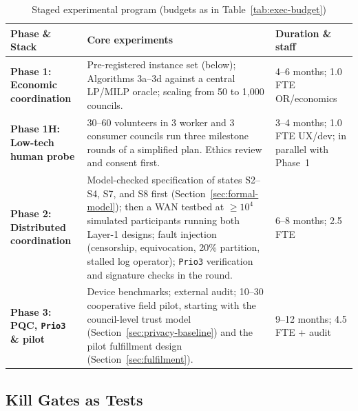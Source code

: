 \documentclass[10pt,twoside,openany]{book}
\theoremstyle{dpepstyle}
\begin{document}
\begin{table}[htbp]
\centering
\caption{Staged experimental program (budgets as in Table~\ref{tab:exec-budget})}
\label{tab:poc-tests}
\scriptsize
\setlength{\tabcolsep}{3.5pt}
\begin{tabularx}{\textwidth}{L{1.20in} Y L{1.05in}}
\toprule
\textbf{Phase \& Stack} & \textbf{Core experiments} & \textbf{Duration \& staff} \\
\midrule
\textbf{Phase 1: Economic coordination} & Pre-registered instance set (below); Algorithms 3a--3d against a central LP/MILP oracle; scaling from 50 to 1,000 councils. & 4--6 months; 1.0 FTE OR/economics \\
\addlinespace[3pt]
\textbf{Phase 1H: Low-tech human probe} & 30--60 volunteers in 3 worker and 3 consumer councils run three milestone rounds of a simplified plan. Ethics review and consent first. & 3--4 months; 1.0 FTE UX/dev; in parallel with Phase~1 \\
\addlinespace[3pt]
\textbf{Phase 2: Distributed coordination} & Model-checked specification of states S2--S4, S7, and S8 first (Section~\ref{sec:formal-model}); then a WAN testbed at $\ge 10^4$ simulated participants running both Layer-1 designs; fault injection (censorship, equivocation, 20\% partition, stalled log operator); \texttt{Prio3} verification and signature checks in the round. & 6--8 months; 2.5 FTE \\
\addlinespace[3pt]
\textbf{Phase 3: PQC, \texttt{Prio3} \& pilot} & Device benchmarks; external audit; 10--30 cooperative field pilot, starting with the council-level trust model (Section~\ref{sec:privacy-baseline}) and the pilot fulfillment design (Section~\ref{sec:fulfilment}). & 9--12 months; 4.5 FTE + audit \\
\bottomrule
\end{tabularx}
\end{table}

\subsection{Kill Gates as Tests}
\label{sec:gates}
\end{document}
